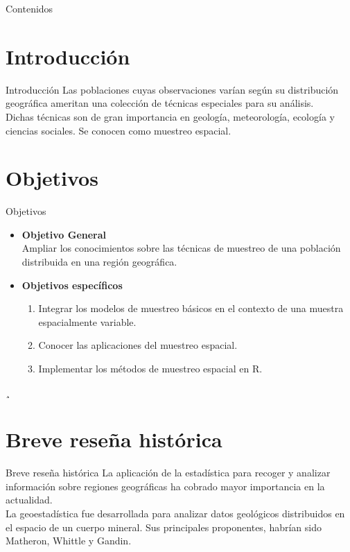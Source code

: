 \documentclass[12pts]{beamer}
\author[Facultad de Ciencias - UNAH]{\color{arsenic}{\textit{\textbf{J. Moisés Arias}}}}
\title{\color{arsenic}{\textbf{Técnicas de Muestreo Espacial: Aplicaciones e Implementación en R}}}
\subtitle{\color{black}{\textbf{Teoría de Muestreo MM535}}}
\date{Abril, 2024}
\begin{document}
	
	\begin{frame}
		\maketitle
	\end{frame}

	\begin{frame}{Contenidos}
		\tableofcontents
	\end{frame}

	\section{Introducción}
	\begin{frame}{Introducción}
		Las poblaciones cuyas observaciones varían según su distribución geográfica ameritan una colección de técnicas especiales para su análisis.\\[1cm]
		
		Dichas técnicas son de gran importancia en geología, meteorología, ecología y ciencias sociales. Se conocen como muestreo espacial.
	\end{frame}

	\section{Objetivos}
	\begin{frame}{Objetivos}
	\begin{itemize}
		\item \textbf{Objetivo General}\\
		Ampliar los conocimientos sobre las técnicas de muestreo de una población  distribuida en una región geográfica. 
		\item \textbf{Objetivos específicos}	
		\begin{enumerate}
			\item Integrar los modelos de muestreo básicos en el contexto de una muestra espacialmente variable. 
			\item Conocer las aplicaciones del muestreo espacial. 
			\item Implementar los métodos de muestreo espacial en R. 
		\end{enumerate}
	\end{itemize}
¸	\end{frame}

	\section{Breve reseña histórica}
	\begin{frame}{Breve reseña histórica}
	La aplicación de la estadística para recoger y analizar información sobre regiones geográficas ha cobrado mayor importancia en la actualidad.\\[1cm]
	
	La geoestadística fue desarrollada para analizar datos geológicos distribuidos en el espacio de un cuerpo mineral. Sus principales proponentes, habrían sido Matheron, Whittle y Gandin.
	\end{frame}
\end{document}
